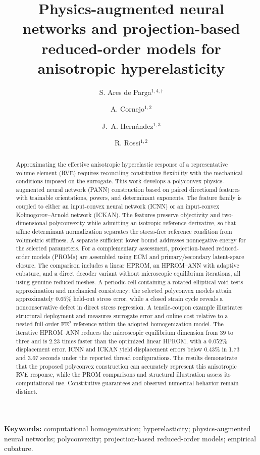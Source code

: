 \documentclass[10pt,a4paper]{article}
\title{Physics-augmented neural networks and projection-based reduced-order models for anisotropic hyperelasticity}
\author{
S. Ares de Parga$^{1,4,\dagger}$ \and
A. Cornejo$^{1,2}$ \and
J.~A. Hern\'andez$^{1,3}$ \and
R. Rossi$^{1,2}$
}
\date{\parbox{.97\textwidth}{\centering\footnotesize
$^1$Centre Internacional de M\`{e}todes Num\`{e}rics en Enginyeria (CIMNE), Barcelona, Spain\\[.3em]
$^2$Universitat Polit\`{e}cnica de Catalunya, Department of Civil and Environmental Engineering (DECA), Barcelona, Spain\\[.3em]
$^3$Universitat Polit\`{e}cnica de Catalunya, Departament de Resist\`{e}ncia de Materials i Estructures a l'Enginyeria, E.S. d'Enginyeries Industrial, Aeroespacial i Audiovisual de Terrassa (ESEIAAT), Terrassa, Spain\\[.3em]
$^4$Department of Aeronautics and Astronautics, Stanford University, Stanford, CA 94305, USA\\[.7em]
\textsuperscript{\(\dagger\)} This work was conducted while S. Ares de Parga was affiliated with CIMNE.\\[.7em]
8 September 2026 --- Working draft v0.2}}
\begin{document}
\maketitle
\begin{abstract}
Approximating the effective anisotropic hyperelastic response of a representative volume element (RVE) requires reconciling constitutive flexibility with the mechanical conditions imposed on the surrogate. This work develops a polyconvex physics-augmented neural network (PANN) construction based on paired directional features with trainable orientations, powers, and determinant exponents. The feature family is coupled to either an input-convex neural network (ICNN) or an input-convex Kolmogorov--Arnold network (ICKAN). The features preserve objectivity and two-dimensional polyconvexity while admitting an isotropic reference derivative, so that affine determinant normalization separates the stress-free reference condition from volumetric stiffness. A separate sufficient lower bound addresses nonnegative energy for the selected parameters. For a complementary assessment, projection-based reduced-order models (PROMs) are assembled using ECM and primary/secondary latent-space closure. The comparison includes a linear HPROM, an HPROM--ANN with adaptive cubature, and a direct decoder variant without microscopic equilibrium iterations, all using genuine reduced meshes. A periodic cell containing a rotated elliptical void tests approximation and mechanical consistency: the selected polyconvex models attain approximately $0.65\%$ held-out stress error, while a closed strain cycle reveals a nonconservative defect in direct stress regression. A tensile-coupon example illustrates structural deployment and measures surrogate error and online cost relative to a nested full-order FE$^2$ reference within the adopted homogenization model. The iterative HPROM--ANN reduces the microscopic equilibrium dimension from 39 to three and is $2.23$ times faster than the optimized linear HPROM, with a $0.052\%$ displacement error. ICNN and ICKAN yield displacement errors below $0.43\%$ in 1.73 and 3.67 seconds under the reported thread configurations. The results demonstrate that the proposed polyconvex construction can accurately represent this anisotropic RVE response, while the PROM comparisons and structural illustration assess its computational use. Constitutive guarantees and observed numerical behavior remain distinct.
\end{abstract}
\noindent\textbf{Keywords:} computational homogenization; hyperelasticity; physics-augmented neural networks; polyconvexity; projection-based reduced-order models; empirical cubature.








\end{document}
